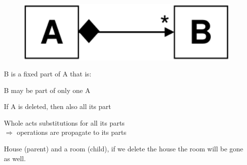 \begin{defnbox}\nospacing
  \begin{defn}[Composite]\label{defn:Composite}\leavevmode
    \begin{minipage}[t]{0.45\textwidth}
      \begin{figure}[H]
        \centering
        \includegraphics[width=1.0\textwidth]{figures/composite.png}
      \end{figure}
    \end{minipage}
    \begin{minipage}[t]{0.5\textwidth}
    \vspace{-3.5em}
    B is a fixed part of A that is:
    \begin{itemizenosep}
        \item B may be part of only one A
        \item If A is deleted, then also all its part
        \item Whole acts substitutions for all its parts\\
      $\Rightarrow$ operations are propagate to its parts
    \end{itemizenosep}
    \end{minipage}
  \end{defn}
\end{defnbox}
\begin{notebox}[Example]\nospacing
    House (parent) and a room (child), if we delete the house the
    room will be gone as well.
\end{notebox}
